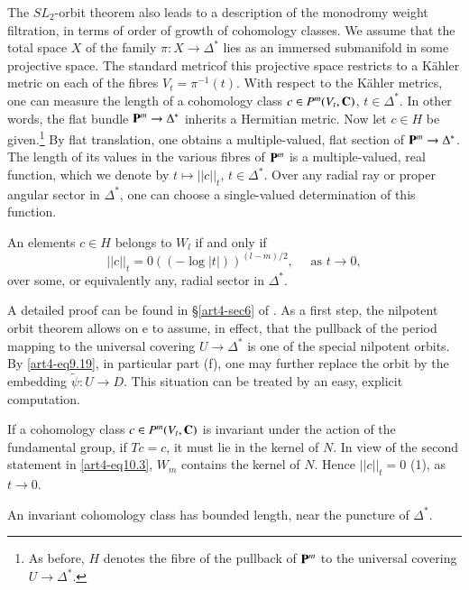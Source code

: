 The $SL_2$-orbit theorem also leads to a description of the monodromy weight filtration, in terms of order of growth of cohomology classes. We assume that the total space $X$ of the family $\pi: X \to \Delta^\ast$ lies as an immersed submanifold in some projective space. The standard metric\pageoriginale of this projective space restricts to a K\"ahler metric on each of the fibres $V_t = \pi^{-1}(t)$. With respect to the K\"ahler metrics, one can measure the length of a cohomology class $c \in P^m (V_t, \mathbf{C})$, $t \in \Delta^\ast$. In other words, the flat bundle $\mathbf{P}^m \to \Delta^\ast$ inherits a Hermitian metric. Now let $c \in H$ be given.\footnote[42]{As before, $H$ denotes the fibre of the pullback of $\mathbf{P}^m$ to the universal covering $U \to \Delta^\ast$.} By flat translation, one obtains a multiple-valued, flat section of $\mathbf{P}^m \to \Delta^\ast$. The length of its values in the various fibres of $\mathbf{P}^m$ is a multiple-valued, real function, which we denote by $t \longmapsto ||c||_t$, $t \in \Delta^\ast$. Over any radial ray or proper angular sector in $\Delta^\ast$, one can choose a single-valued determination of this function.

\begin{theorem}\label{art4-thm10.8}
An elements $c \in H$ belongs to $W_l$ if and only if 
$$
||c ||_t = 0 ((-\log |t|))^{(l-m)/2}, \quad \text{ as } t \to 0,
$$
over some, or equivalently any, radial sector in $\Delta^\ast$.
\end{theorem}

A detailed proof can be found in \S \ref{art4-sec6} of \cite{art4-key41}. As a first step, the nilpotent orbit theorem allows on e to assume, in effect, that the pullback of the period mapping to the universal covering $U \to \Delta^\ast$ is one of the special nilpotent orbits. By \eqref{art4-eq9.19}, in particular part (f), one may further replace the orbit by the embedding $\tilde{\psi} : U \to D$. This situation can be treated by an easy, explicit computation.

If a cohomology class $c \in P^m (V_t, \mathbf{C})$ is invariant under the action of the fundamental group, \ie if $Tc = c$, it must lie in the kernel of $N$. In view of the second statement in \eqref{art4-eq10.3}, $W_m$ contains the kernel of $N$. Hence $||c||_t = 0$ (1), as $t \to 0$.

\setcounter{coro}{8}
\begin{coro}\label{art4-eq10.9}
An invariant cohomology class has bounded length, near the puncture of $\Delta^\ast$.
\end{coro}

